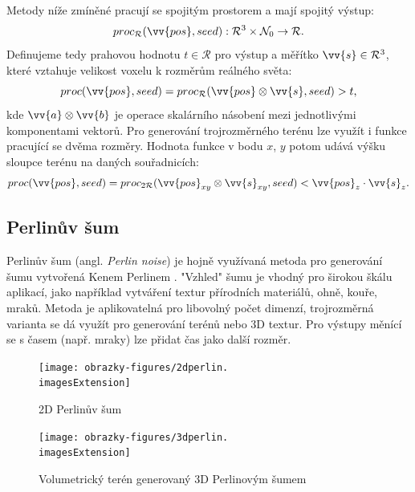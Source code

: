 Metody níže zmíněné pracují se spojitým prostorem a mají spojitý výstup:
\begin{equation}
	proc_\mathcal{R}(\vv{pos}, seed): \mathcal{R}^3 \times \mathcal{N}_0 \rightarrow \mathcal{R} \text{.}
\end{equation}
Definujeme tedy prahovou hodnotu $t \in \mathcal{R}$ pro výstup a měřítko $\vv{s} \in \mathcal{R}^3$, které vztahuje velikost voxelu k rozměrům reálného světa:
\begin{equation}
	proc(\vv{pos}, seed) = proc_\mathcal{R}(\vv{pos} \otimes \vv{s}, seed) > t \text{,}
\end{equation}
kde $\vv{a} \otimes \vv{b}$ je operace skalárního násobení mezi jednotlivými komponentami vektorů. Pro generování trojrozměrného terénu lze využít i funkce pracující se dvěma rozměry. Hodnota funkce v bodu $x$, $y$ potom udává výšku sloupce terénu na daných souřadnicích:
\begin{equation}
	proc(\vv{pos}, seed) = proc_{2\mathcal{R}}(\vv{pos}_{xy} \otimes \vv{s}_{xy}, seed) < \vv{pos}_z \cdot \vv{s}_z \text{.}
\end{equation}

\subsection{Perlinův šum}
Perlinův šum (angl. \textit{Perlin noise}) je hojně využívaná metoda pro generování šumu vytvořená Kenem Perlinem \cite{Perlin:1985:IS:325165.325247,PerlinKen2002In}. "Vzhled" šumu je vhodný pro širokou škálu aplikací, jako například vytváření textur přírodních materiálů, ohně, kouře, mraků. Metoda je aplikovatelná pro libovolný počet dimenzí, trojrozměrná varianta se dá využít pro generování terénů nebo 3D textur. Pro výstupy měnící se s časem (např. mraky) lze přidat čas jako další rozměr.

\begin{figure}[H]
	\centering
	\begin{minipage}[t]{0.48\textwidth}
		\centering
		\texttt{[image: obrazky-figures/2dperlin.\\imagesExtension]}
		\caption{2D Perlinův šum}
	\end{minipage}
	\hfill
	\begin{minipage}[t]{0.48\textwidth}
		\centering
		\texttt{[image: obrazky-figures/3dperlin.\\imagesExtension]}
		\caption{Volumetrický terén generovaný 3D Perlinovým šumem}
	\end{minipage}
\end{figure}

